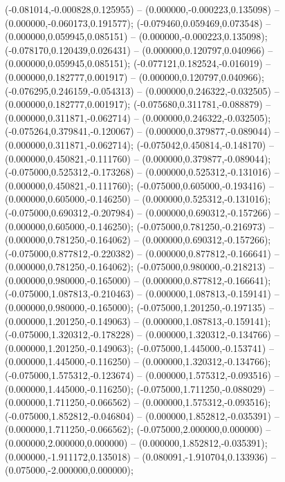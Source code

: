  (-0.081014,-0.000828,0.125955) -- (0.000000,-0.000223,0.135098) -- (0.000000,-0.060173,0.191577);
 (-0.079460,0.059469,0.073548) -- (0.000000,0.059945,0.085151) -- (0.000000,-0.000223,0.135098);
 (-0.078170,0.120439,0.026431) -- (0.000000,0.120797,0.040966) -- (0.000000,0.059945,0.085151);
 (-0.077121,0.182524,-0.016019) -- (0.000000,0.182777,0.001917) -- (0.000000,0.120797,0.040966);
 (-0.076295,0.246159,-0.054313) -- (0.000000,0.246322,-0.032505) -- (0.000000,0.182777,0.001917);
 (-0.075680,0.311781,-0.088879) -- (0.000000,0.311871,-0.062714) -- (0.000000,0.246322,-0.032505);
 (-0.075264,0.379841,-0.120067) -- (0.000000,0.379877,-0.089044) -- (0.000000,0.311871,-0.062714);
 (-0.075042,0.450814,-0.148170) -- (0.000000,0.450821,-0.111760) -- (0.000000,0.379877,-0.089044);
 (-0.075000,0.525312,-0.173268) -- (0.000000,0.525312,-0.131016) -- (0.000000,0.450821,-0.111760);
 (-0.075000,0.605000,-0.193416) -- (0.000000,0.605000,-0.146250) -- (0.000000,0.525312,-0.131016);
 (-0.075000,0.690312,-0.207984) -- (0.000000,0.690312,-0.157266) -- (0.000000,0.605000,-0.146250);
 (-0.075000,0.781250,-0.216973) -- (0.000000,0.781250,-0.164062) -- (0.000000,0.690312,-0.157266);
 (-0.075000,0.877812,-0.220382) -- (0.000000,0.877812,-0.166641) -- (0.000000,0.781250,-0.164062);
 (-0.075000,0.980000,-0.218213) -- (0.000000,0.980000,-0.165000) -- (0.000000,0.877812,-0.166641);
 (-0.075000,1.087813,-0.210463) -- (0.000000,1.087813,-0.159141) -- (0.000000,0.980000,-0.165000);
 (-0.075000,1.201250,-0.197135) -- (0.000000,1.201250,-0.149063) -- (0.000000,1.087813,-0.159141);
 (-0.075000,1.320312,-0.178228) -- (0.000000,1.320312,-0.134766) -- (0.000000,1.201250,-0.149063);
 (-0.075000,1.445000,-0.153741) -- (0.000000,1.445000,-0.116250) -- (0.000000,1.320312,-0.134766);
 (-0.075000,1.575312,-0.123674) -- (0.000000,1.575312,-0.093516) -- (0.000000,1.445000,-0.116250);
 (-0.075000,1.711250,-0.088029) -- (0.000000,1.711250,-0.066562) -- (0.000000,1.575312,-0.093516);
 (-0.075000,1.852812,-0.046804) -- (0.000000,1.852812,-0.035391) -- (0.000000,1.711250,-0.066562);
 (-0.075000,2.000000,0.000000) -- (0.000000,2.000000,0.000000) -- (0.000000,1.852812,-0.035391);
 (0.000000,-1.911172,0.135018) -- (0.080091,-1.910704,0.133936) -- (0.075000,-2.000000,0.000000);

